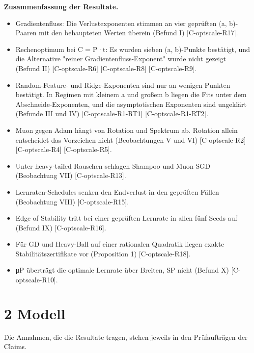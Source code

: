 \documentclass[10pt,twocolumn]{article}
\begin{document}
\textbf{Zusammenfassung der Resultate.}
\begin{itemize}
\item Gradientenfluss: Die Verlustexponenten stimmen an vier geprüften (a, b)-Paaren mit den behaupteten Werten überein (Befund I) {\scriptsize[C-optscale-R17]}.
\item Rechenoptimum bei C = P·t: Es wurden sieben (a, b)-Punkte bestätigt, und die Alternative "reiner Gradientenfluss-Exponent" wurde nicht gezeigt (Befund II) {\scriptsize[C-optscale-R6]} {\scriptsize[C-optscale-R8]} {\scriptsize[C-optscale-R9]}.
\item Random-Feature- und Ridge-Exponenten sind nur an wenigen Punkten bestätigt. In Regimen mit kleinem a und großem b liegen die Fits unter dem Abschneide-Exponenten, und die asymptotischen Exponenten sind ungeklärt (Befunde III und IV) {\scriptsize[C-optscale-R1-RT1]} {\scriptsize[C-optscale-R1-RT2]}.
\item Muon gegen Adam hängt von Rotation und Spektrum ab. Rotation allein entscheidet das Vorzeichen nicht (Beobachtungen V und VI) {\scriptsize[C-optscale-R2]} {\scriptsize[C-optscale-R4]} {\scriptsize[C-optscale-R5]}.
\item Unter heavy-tailed Rauschen schlagen Shampoo und Muon SGD (Beobachtung VII) {\scriptsize[C-optscale-R13]}.
\item Lernraten-Schedules senken den Endverlust in den geprüften Fällen (Beobachtung VIII) {\scriptsize[C-optscale-R15]}.
\item Edge of Stability tritt bei einer geprüften Lernrate in allen fünf Seeds auf (Befund IX) {\scriptsize[C-optscale-R16]}.
\item Für GD und Heavy-Ball auf einer rationalen Quadratik liegen exakte Stabilitätszertifikate vor (Proposition 1) {\scriptsize[C-optscale-R18]}.
\item μP überträgt die optimale Lernrate über Breiten, SP nicht (Befund X) {\scriptsize[C-optscale-R10]}.
\end{itemize}

\section{2 Modell}

Die Annahmen, die die Resultate tragen, stehen jeweils in den Prüfaufträgen der Claims.
\end{document}
